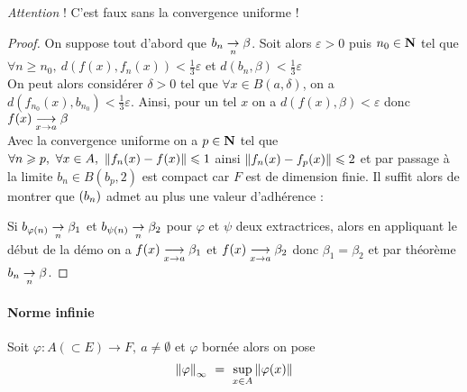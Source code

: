      \medskip
        
    \emph{Attention} ! C'est faux sans la convergence uniforme !
        
    \begin{proof}
        On suppose tout d'abord que $b_n \underset{n}{\rightarrow} \beta$. Soit alors $\varepsilon >0$ puis $n_0\in {\mathbf{N}}$ tel que $\forall n\geqslant n_0 ,~d(f(x),f_n(x) ) <\frac{1}{3} \varepsilon$ et $d(b_n ,\beta )< \frac{1}{3}\varepsilon$ \\ 
        On peut alors considérer $\delta >0$ tel que $\forall x\in B(a,\delta )$, on a $d(f_{n_0}(x), b_{n_0})<\frac{1}{3}\varepsilon$. Ainsi, pour un tel $x$ on a $d(f(x),\beta ) <\varepsilon$ donc $f(x) \underset{x \to a}{\longrightarrow} \beta$\\ 
        
        Avec la convergence uniforme on a $p\in{\mathbf{N}}$ tel que $\forall n\geqslant p ,~\forall x\in A,~\left\Vert f_n(x)-f(x) \right\Vert\leqslant 1$ ainsi $\left\Vert f_n(x)-f_p(x) \right\Vert \leqslant 2$ et par passage à la limite $b_n\in B(b_p ,2)$ est compact car $F$ est de dimension finie. Il suffit alors de montrer que $(b_n)$ admet au plus une valeur d'adhérence :
        
        Si $b_{\varphi (n)} \underset{n}{\rightarrow} \beta_1$ et $b_{\psi (n)} \underset{n}{\rightarrow} \beta_2$ pour $\varphi$ et $\psi$ deux extractrices, alors en appliquant le début de la 
        démo on a $f(x) \underset{x \to a}{\longrightarrow} \beta_1$ et $f(x) \underset{x \to a}{\longrightarrow} \beta_2$ donc $\beta_1 = \beta_2$ et par théorème 
        $b_n \underset{n}{\rightarrow} \beta$.
    \end{proof} \medskip

    \traitd
    \paragraph{Norme infinie}
        Soit $\varphi :A (\subset E) \rightarrow F ,~a\neq\emptyset$ et $\varphi$ bornée alors on pose 
        \[
			\norm{\varphi}_{\infty} ~=~ \underset{x\in A}{\mathrm{sup}} \norm{\varphi (x) }
		\vspace{-20pt}
		\] 
    \trait
    
    \newpage
    

